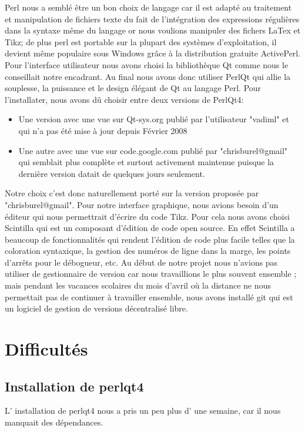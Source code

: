 \documentclass[a4paper]{report}
\begin{document}
Perl nous a semblé être un bon choix de langage car il est adapté au traitement et manipulation de fichiers texte du fait de l'intégration des expressions régulières dans la syntaxe même du langage or nous voulions manipuler des fichers LaTex et Tikz; de plus perl est portable sur la plupart des systèmes d'exploitation, il devient même populaire sous Windows grâce à la distribution gratuite ActivePerl. 
Pour l'interface utilisateur nous avons choisi la bibliothèque Qt comme nous le conseillait notre encadrant. Au final nous avons donc utiliser PerlQt qui allie la souplesse, la puissance et le design élégant de Qt au langage Perl. Pour l'installater, nous avons dû choisir entre deux versions de PerlQt4:
\begin{itemize}
 \item Une version avec une vue sur Qt-sys.org publié par l'utilisateur "vadiml" et qui n'a pas été mise à jour depuis Février 2008
 \item Une autre avec une vue sur code.google.com publié par "chrisburel@gmail" qui semblait plus complète et surtout activement maintenue puisque la dernière version datait de quelques jours seulement.
\end{itemize}
  Notre choix c'est donc naturellement porté sur la version proposée par "chrisburel@gmail".
  \newline 
  Pour notre interface graphique, nous avions besoin d'un éditeur qui nous permettrait d'écrire du code Tikz. Pour cela nous avons choisi Scintilla qui est un composant d'édition de code open source. En effet Scintilla a beaucoup de fonctionnalités qui rendent l'édition de code plus facile telles que la coloration syntaxique, la gestion des numéros de ligne dans la marge, les points d'arrêts pour le débogueur, etc.
  \newline
  Au début de notre projet nous n'avions pas utiliser de gestionnaire de version car nous travaillions le plus souvent ensemble ; mais pendant les vacances scolaires du mois d'avril où la distance ne nous permettait pas de continuer à travailler ensemble, nous avons installé git qui est un logiciel de gestion de versions décentralisé libre. 

\section{Difficultés}
\subsection{Installation de perlqt4}
L' installation de perlqt4 nous a pris un peu plus d' une semaine,
car il nous manquait des dépendances.
\end{document}
